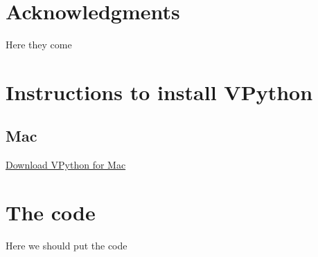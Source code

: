 \documentclass[12pt]{iopart}
\begin{document}
\appendix



\section*{Acknowledgments}
Here they come



\section{Instructions to install VPython}\label{appendix:python}
\subsection{Mac}
\href{http://vpython.org/contents/download_mac.html}{Download VPython for Mac}



\section{The code}\label{sec:code}
Here we should put the code





\end{document}
